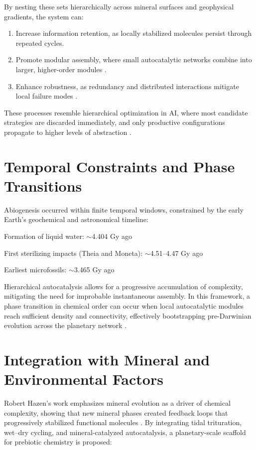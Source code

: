\documentclass{book}
\begin{document}
By nesting these sets hierarchically across mineral surfaces and geophysical gradients, the system can:

\begin{enumerate}
\item Increase information retention, as locally stabilized molecules persist through repeated cycles.
\item Promote modular assembly, where small autocatalytic networks combine into larger, higher-order modules \citep{peng2022}.
\item Enhance robustness, as redundancy and distributed interactions mitigate local failure modes \citep{steel2013}.
\end{enumerate}

These processes resemble hierarchical optimization in AI, where most candidate strategies are discarded immediately, and only productive configurations propagate to higher levels of abstraction \citep{day2024}.

\section{Temporal Constraints and Phase Transitions}
Abiogenesis occurred within finite temporal windows, constrained by the early Earth’s geochemical and astronomical timeline:

Formation of liquid water: $\sim$4.404 Gy ago \citep{mojzsis1996}

First sterilizing impacts (Theia and Moneta): $\sim$4.51–4.47 Gy ago

Earliest microfossils: $\sim$3.465 Gy ago \citep{rosing1999}

Hierarchical autocatalysis allows for a progressive accumulation of complexity, mitigating the need for improbable instantaneous assembly. In this framework, a phase transition in chemical order can occur when local autocatalytic modules reach sufficient density and connectivity, effectively bootstrapping pre-Darwinian evolution across the planetary network \citep{plum2025, peng2020}.

\section{Integration with Mineral and Environmental Factors}
Robert Hazen’s work emphasizes mineral evolution as a driver of chemical complexity, showing that new mineral phases created feedback loops that progressively stabilized functional molecules \citep{hazen2008}. By integrating tidal trituration, wet–dry cycling, and mineral-catalyzed autocatalysis, a planetary-scale scaffold for prebiotic chemistry is proposed:
\end{document}
